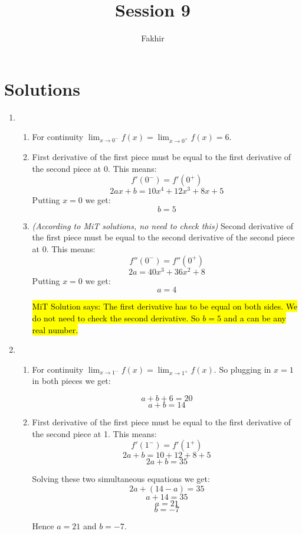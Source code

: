 \documentclass[]{article}
\title{Session 9}
\author{Fakhir}
\DeclareRobustCommand{\hlred}[1]{{\sethlcolor{red}\hl{#1}}}
\begin{document}
\maketitle

\section*{Solutions}

\begin{enumerate}
	\item \begin{enumerate}
		\item For continuity $\lim_{x\to0^{-}} f(x) = \lim_{x\to0^{+}} f(x) = 6$.
		\item First derivative of the first piece must be equal to the first derivative of the second piece at 0. This means:
		$$ f'(0^{-}) = f'(0^{+})$$
		$$ 2ax + b = 10x^{4}+12x^{3}+8x+5 $$
		Putting $x = 0$ we get:
		$$b = 5$$
		\item \textit{(According to MiT solutions, no need to check this)} Second derivative of the first piece must be equal to the second derivative of the second piece at 0. This means:
		$$ f''(0^{-}) = f''(0^{+})$$
		$$ 2a = 40x^{3}+36x^{2}+8 $$
		Putting $x = 0$ we get:
		$$a = 4$$
		
		\hlred{MiT Solution says: The first derivative has to be equal on both sides. We do not need to check the second derivative. So $b=5$ and a can be any real number.}
	\end{enumerate}
	
	\item \begin{enumerate}
		\item For continuity $\lim_{x\to1^{-}} f(x) = \lim_{x\to1^{+}} f(x)$. So plugging in $x=1$ in both pieces we get:
		
		$$ a+b+6 = 20 $$
		$$ a+b = 14 $$
		\item First derivative of the first piece must be equal to the first derivative of the second piece at 1. This means:
		$$ f'(1^{-}) = f'(1^{+})$$
		$$ 2a+b = 10+12+8+5 $$
		$$ 2a+b = 35 $$
	
		Solving these two simultaneous equations we get:
		$$ 2a + (14-a) = 35 $$
		$$ a + 14 = 35 $$
		$$ a = 21 $$
		$$ b = -7 $$
	
		Hence $a=21$ and $b=-7$.
	
	\end{enumerate}
	
\end{enumerate}
\end{document}

